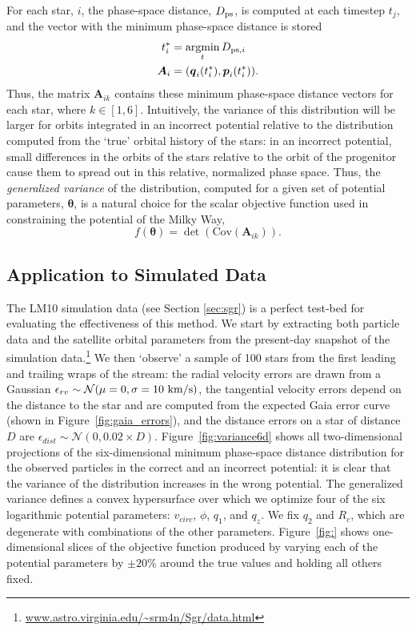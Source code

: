 \documentclass[preprint]{aastex}
\newcommand{\bs}{\boldsymbol}
\newcommand{\argmin}{\operatornamewithlimits{argmin}}
\begin{document}
For each star, $i$,
the phase-space distance, $D_{\rm ps}$, is computed at each timestep
$t_{j}$, and the vector with the minimum phase-space distance is stored
\begin{align}
  t^*_{i} &= \argmin_{t} D_{{\rm ps},i}\\
  \bs{A}_{i} &= (\bs{q}_{i}(t^*_{i}),\bs{p}_{i}(t^*_{i})).
\end{align}
Thus, the matrix $\bs{A}_{ik}$ contains these minimum phase-space distance vectors for each star,
where $k\in[1,6]$. Intuitively, the variance of this distribution
will be larger for orbits integrated in an incorrect potential
relative to the distribution computed from the `true' orbital history
of the stars: in an incorrect potential, small differences in the
orbits of the stars relative to the orbit of the progenitor cause them
to spread out in this relative, normalized phase space. Thus, the
\emph{generalized variance} of the distribution, computed for a given
set of potential parameters, $\bs{\theta}$, is a natural choice for
the scalar objective function used in constraining the potential of
the Milky Way,
\begin{equation}
  f(\bs{\theta})=\det(\mathrm{Cov}( \bs{A}_{ik})).
\end{equation}

\subsection{Application to Simulated Data}
The LM10 simulation data (see Section \ref{sec:sgr}) is a perfect
test-bed for evaluating the effectiveness of this method. We start by
extracting both particle data and the satellite orbital parameters
from the present-day snapshot of the simulation
data.\footnote{\url{www.astro.virginia.edu/~srm4n/Sgr/data.html}} We then
`observe' a sample of 100 stars from the first leading and trailing
wraps of the stream: the radial velocity errors are drawn from a
Gaussian $\epsilon_{rv} \sim \mathcal{N}(\mu=0,\sigma=10~{\rm km/s})$,
the tangential velocity errors depend on the distance to the star and
are computed from the expected Gaia error curve (shown in
Figure~\ref{fig:gaia_errors}), and the distance errors on a star of distance
$D$ are $\epsilon_{dist} \sim \mathcal{N}(0,0.02\times
D)$. Figure~\ref{fig:variance6d} shows all two-dimensional projections of the six-dimensional minimum
phase-space distance distribution for the observed particles in the
correct and an incorrect potential: it is clear that the
variance of the distribution increases in the wrong potential. The 
generalized variance defines a convex hypersurface over which we
optimize four of the six logarithmic potential parameters:
$v_{circ}$, $\phi$, $q_1$, and $q_z$. We fix $q_2$ and $R_c$, which are degenerate with combinations of the other parameters. Figure~\ref{fig:} shows one-dimensional slices of the objective function
produced by varying each of the potential parameters by
$\pm20\%$ around the true values and holding all others fixed.
\end{document}

